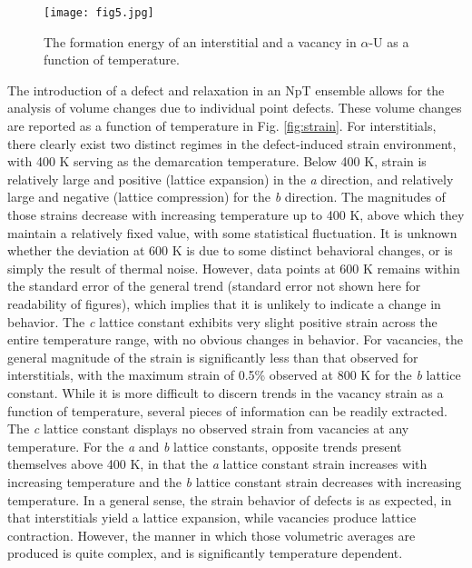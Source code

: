 \documentclass[utf8]{frontiersSCNS} %
\begin{document}
 \begin{figure}[hbt]
	\centering
	\texttt{[image: fig5.jpg]}
    \caption{The formation energy of an interstitial and a vacancy in $\alpha$-U as a function of temperature.}\label{fig:defs}
\end{figure}

The introduction of a defect and relaxation in an NpT ensemble allows for the analysis of volume changes due to individual point defects. These volume changes are reported as a function of temperature in Fig. \ref{fig:strain}. For interstitials, there clearly exist two distinct regimes in the defect-induced strain environment, with 400 K serving as the demarcation temperature. Below 400 K, strain is relatively large and positive (lattice expansion) in the \textit{a} direction, and relatively large and negative (lattice compression) for the \textit{b} direction. The magnitudes of those strains decrease with increasing temperature up to 400 K, above which they maintain a relatively fixed value, with some statistical fluctuation. It is unknown whether the deviation at 600 K is due to some distinct behavioral changes, or is simply the result of thermal noise. However, data points at 600 K remains within the standard error of the general trend (standard error not shown here for readability of figures), which implies that it is unlikely to indicate a change in behavior. The \textit{c} lattice constant exhibits very slight positive strain across the entire temperature range, with no obvious changes in behavior. For vacancies, the general magnitude of the strain is significantly less than that observed for interstitials, with the maximum strain of 0.5\% observed at 800 K for the \textit{b} lattice constant. While it is more difficult to discern trends in the vacancy strain as a function of temperature, several pieces of information can be readily extracted. The \textit{c} lattice constant displays no observed strain from vacancies at any temperature. For the \textit{a} and \textit{b} lattice constants, opposite trends present themselves above 400 K, in that the \textit{a} lattice constant strain increases with increasing temperature and the \textit{b} lattice constant strain decreases with increasing temperature. In a general sense, the strain behavior of defects is as expected, in that interstitials yield a lattice expansion, while vacancies produce lattice contraction. However, the manner in which those volumetric averages are produced is quite complex, and is significantly temperature dependent. 
\end{document}
